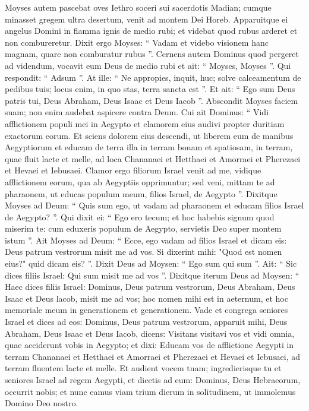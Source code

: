 \begin{biblechapter}
\begin{biblechapter}
\begin{biblechapter}
\verse Moyses autem pascebat oves Iethro soceri sui sacerdotis Madian; cumque minasset gregem ultra desertum, venit ad montem Dei Horeb. 
\verse Apparuitque ei angelus Domini in flamma ignis de medio rubi; et videbat quod rubus arderet et non combureretur.
 \verse Dixit ergo Moyses: “ Vadam et videbo visionem hanc magnam, quare non comburatur rubus ”. 
\verse Cernens autem Dominus quod pergeret ad videndum, vocavit eum Deus de medio rubi et ait: “ Moyses, Moyses ”. Qui respondit: “ Adsum ”. 
\verse At ille: “ Ne appropies, inquit, huc; solve calceamentum de pedibus tuis; locus enim, in quo stas, terra sancta est ”. 
\verse Et ait: “ Ego sum Deus patris tui, Deus Abraham, Deus Isaac et Deus Iacob ”. Abscondit Moyses faciem suam; non enim audebat aspicere contra Deum.
 \verse Cui ait Dominus: “ Vidi afflictionem populi mei in Aegypto et clamorem eius audivi propter duritiam exactorum eorum. 
\verse Et sciens dolorem eius descendi, ut liberem eum de manibus Aegyptiorum et educam de terra illa in terram bonam et spatiosam, in terram, quae fluit lacte et melle, ad loca Chananaei et Hetthaei et Amorraei et Pherezaei et Hevaei et Iebusaei. 
\verse Clamor ergo filiorum Israel venit ad me, vidique afflictionem eorum, qua ab Aegyptiis opprimuntur; 
 \verse sed veni, mittam te ad pharaonem, ut educas populum meum, filios Israel, de Aegypto ”. 
\verse Dixitque Moyses ad Deum: “ Quis sum ego, ut vadam ad pharaonem et educam filios Israel de Aegypto? ”. 
\verse Qui dixit ei: “ Ego ero tecum; et hoc habebis signum quod miserim te: cum eduxeris populum de Aegypto, servietis Deo super montem istum ”.
 \verse Ait Moyses ad Deum: “ Ecce, ego vadam ad filios Israel et dicam eis: Deus patrum vestrorum misit me ad vos. Si dixerint mihi: "Quod est nomen eius?" quid dicam eis? ”. 
\verse Dixit Deus ad Moysen: “ Ego sum qui sum ”. Ait: “ Sic dices filiis Israel: Qui sum misit me ad vos ”. 
\verse Dixitque iterum Deus ad Moysen: “ Haec dices filiis Israel: Dominus, Deus patrum vestrorum, Deus Abraham, Deus Isaac et Deus lacob, misit me ad vos; hoc nomen mihi est in aeternum, et hoc memoriale meum in generationem et generationem. 
\verse Vade et congrega seniores Israel et dices ad eos: Dominus, Deus patrum vestrorum, apparuit mihi, Deus Abraham, Deus Isaac et Deus Iacob, dicens: Visitans visitavi vos et vidi omnia, quae acciderunt vobis in Aegypto; 
\verse et dixi: Educam vos de afflictione Aegypti in terram Chananaei et Hetthaei et Amorraei et Pherezaei et Hevaei et Iebusaei, ad terram fluentem lacte et melle. 
\verse Et audient vocem tuam; ingredierisque tu et seniores Israel ad regem Aegypti, et dicetis ad eum: Dominus, Deus Hebraeorum, occurrit nobis; et nunc eamus viam trium dierum in solitudinem, ut immolemus Domino Deo nostro.

\end{biblechapter}
\end{biblechapter}
\end{biblechapter}
